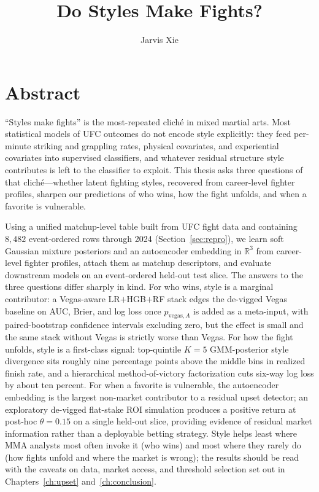 \documentclass[12pt,oneside]{report}
\title{Do Styles Make Fights?}
\author{Jarvis Xie}
\begin{document}


\chapter*{Abstract}
\thispagestyle{empty}

``Styles make fights'' is the most-repeated cliché in mixed martial
arts.  Most statistical models of UFC outcomes do not encode style
explicitly: they feed per-minute striking and grappling rates, physical
covariates, and experiential covariates into supervised classifiers, and whatever
residual structure style contributes is left to the classifier to
exploit.  This thesis asks three questions of that cliché---whether
latent fighting styles, recovered from career-level fighter profiles,
sharpen our predictions of who wins, how the fight
unfolds, and when a favorite is vulnerable.

Using a unified matchup-level table built from UFC fight data and
containing $8{,}482$ event-ordered rows through 2024 (Section~\ref{sec:repro}), we learn soft
Gaussian mixture posteriors and an autoencoder
embedding in \(\mathbb{R}^3\) from career-level fighter profiles, attach them as
matchup descriptors, and evaluate downstream
models on an event-ordered held-out test slice.  The answers to the
three questions differ sharply in kind.  For who wins, style
is a marginal contributor: a Vegas-aware LR$+$HGB$+$RF stack edges the de-vigged Vegas baseline on
AUC, Brier, and log loss once \(p_{\mathrm{vegas},A}\) is added as a meta-input, with paired-bootstrap confidence intervals
excluding zero, but the effect is small and the same stack without Vegas
is strictly worse than Vegas.  For how the fight
unfolds, style is a first-class signal: top-quintile \(K = 5\)
GMM-posterior style divergence sits roughly nine percentage points above the middle bins in realized finish rate, and a hierarchical method-of-victory factorization
cuts six-way log loss by about ten percent.  For when a
favorite is vulnerable, the autoencoder embedding is the largest
non-market contributor to a residual upset detector; an exploratory de-vigged
flat-stake ROI simulation produces a positive return at post-hoc \(\theta = 0.15\) on a single
held-out slice, providing evidence of residual market information
rather than a deployable betting strategy.  Style helps least where
MMA analysts most often invoke it (who wins) and most where they
rarely do (how fights unfold and where the market is wrong); the
results should be read with the caveats on data, market access, and
threshold selection set out in Chapters~\ref{ch:upset}
and~\ref{ch:conclusion}.
\end{document}
